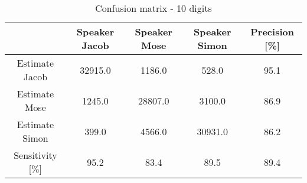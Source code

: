 \begin{table}[H]                                                    
\centering                                                          
\begin{tabular}{|c|c|c|c|c|}                                        
\hline                                                              
  & Speaker Jacob & Speaker Mose & Speaker Simon & Precision [\%] \\
\hline                                                              
Estimate Jacob & 32915.0 & 1186.0 & 528.0 & 95.1 \\                 
\hline                                                              
Estimate Mose & 1245.0 & 28807.0 & 3100.0 & 86.9 \\                 
\hline                                                              
Estimate Simon & 399.0 & 4566.0 & 30931.0 & 86.2 \\                 
\hline                                                              
Sensitivity [\%] & 95.2 & 83.4 & 89.5 & 89.4 \\                     
\hline                                                              
\end{tabular}                                                       
\caption{Confusion matrix - 10 digits}                              
\label{table:ANN_conf_10}                                           
\end{table}
